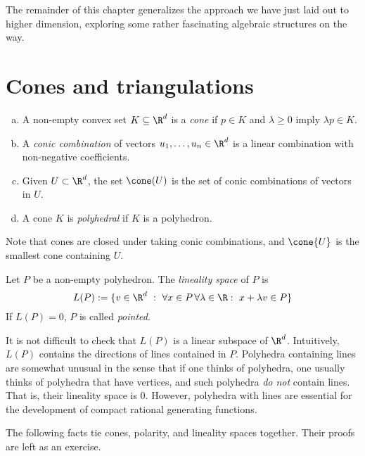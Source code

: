 The remainder of this chapter generalizes the approach we have just laid out to higher dimension,
exploring some rather fascinating algebraic structures on the way.



\section{Cones and triangulations}

\begin{definition}
  \begin{enumerate}[(a)]
    \item A non-empty convex set $K \subseteq \R^d$ is a \emph{cone}
      if $p \in K$ and $\lambda \geq 0$ imply $\lambda p \in K$.
  
    \item A \emph{conic combination} of vectors $u_1, \ldots, u_n \in \R^d$ is
      a linear combination with non-negative coefficients.
  
    \item Given $U \subset \R^d$, the set $\cone(U)$ is the set of conic combinations of vectors in $U$.
  
    \item A cone $K$ is \emph{polyhedral} if $K$ is a polyhedron.
  \end{enumerate}
\end{definition}

Note that cones are closed under taking conic combinations,
and $\cone{U}$ is the smallest cone containing $U$.

\begin{definition}
  Let $P$ be a non-empty polyhedron.
  The \emph{lineality space} of $P$ is
  \[
    L(P) := \{ v \in \R^d ~:~ \forall x\in P \,\forall \lambda \in \R:~ x + \lambda v \in P  \}
  \]
  If $L(P) = 0$, $P$ is called \emph{pointed}.
\end{definition}

It is not difficult to check that $L(P)$ is a linear subspace of $\R^d$.
Intuitively, $L(P)$ contains the directions of lines contained in $P$.
Polyhedra containing lines are somewhat unusual in the sense
that if one thinks of polyhedra, one usually thinks of polyhedra that have vertices,
and such polyhedra \emph{do not} contain lines.
That is, their lineality space is $0$.
However, polyhedra with lines are essential for the development of compact rational generating functions.

The following facts tie cones, polarity, and lineality spaces together.
Their proofs are left as an exercise.

